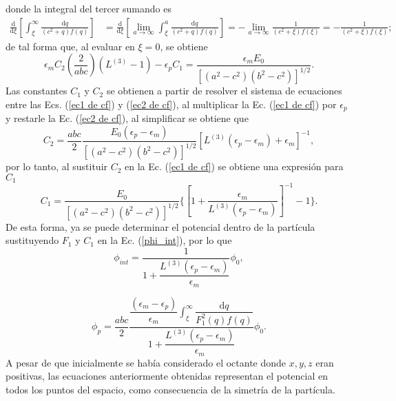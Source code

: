 donde la integral del tercer sumando es
\begin{align*}
    \frac{\text{d}}{\text{d}\xi}\left[\int_{\xi}^{\infty}\frac{\text{d}q}{(c^2+q)f(q)}\right]&=\frac{\text{d}}{\text{d}\xi}\left[\lim_{a\to\infty}\int_{\xi}^{a}\frac{\text{d}q}{(c^2+q)f(q)}\right]=-\lim_{a\to\infty}\frac{1}{(c^2+\xi)f(\xi)}=-\frac{1}{(c^2+\xi)f(\xi)};
\end{align*}
de tal forma que, al evaluar en $\xi=0$, se obtiene
\begin{equation}
    \epsilon_m C_2\left(\frac{2}{abc}\right)\left(L^{(3)}-1\right)- \epsilon_p C_1=\frac{\epsilon_m E_0}{[(a^2-c^2)(b^2-c^2)]^{1/2}}.
     \label{ec2 de cf}
\end{equation}
Las constantes $C_1$ y $C_2$ se obtienen a partir de  resolver el sistema de ecuaciones entre las Ecs. (\ref{ec1 de cf}) y (\ref{ec2 de cf}), al multiplicar la Ec. (\ref{ec1 de cf}) por $\epsilon_p$ y restarle la Ec. (\ref{ec2 de cf}), al simplificar se obtiene que
\begin{equation*}
    C_2=\frac{abc}{2}\frac{E_0(\epsilon_p-\epsilon_m)}{[(a^2-c^2)(b^2-c^2)]^{1/2}}\left[L^{(3)}(\epsilon_p-\epsilon_m)+\epsilon_m\right]^{-1},
\end{equation*}
por lo tanto, al sustituir $C_2$ en la Ec. (\ref{ec1 de cf}) se obtiene una expresión para $C_1$
\begin{equation*}
    C_1=\frac{E_0}{[(a^2-c^2)(b^2-c^2)]^{1/2}}\Bigg\{ \left[1+\frac{\epsilon_m}{L^{(3)}(\epsilon_p-\epsilon_m)}\right]^{-1}-1\Bigg\}.
\end{equation*}
De esta forma, ya se puede determinar el potencial dentro de la partícula sustituyendo $F_1$ y $C_1$ en la Ec. (\ref{phi_int}), por lo que
\begin{equation}
	\phi_{int}=\frac{1}{1+\dfrac{L^{(3)}(\epsilon_p-\epsilon_m)}{\epsilon_m}}\phi_0,
\end{equation}

\begin{equation}
	\phi_p=\frac{abc}{2}\frac{\dfrac{(\epsilon_m-\epsilon_p)}{\epsilon_m}{\displaystyle\int_{\xi}^{\infty}}\dfrac{\text{d}q}{F_1^2(q)f(q)}}{1+\dfrac{L^{(3)}(\epsilon_p-\epsilon_m)}{\epsilon_m}}\phi_0.
\end{equation}
A pesar de que inicialmente se había considerado el octante donde $x,y,z$ eran positivas, las ecuaciones anteriormente obtenidas representan el potencial en todos los puntos del espacio, como consecuencia de la simetría de la partícula.\\

